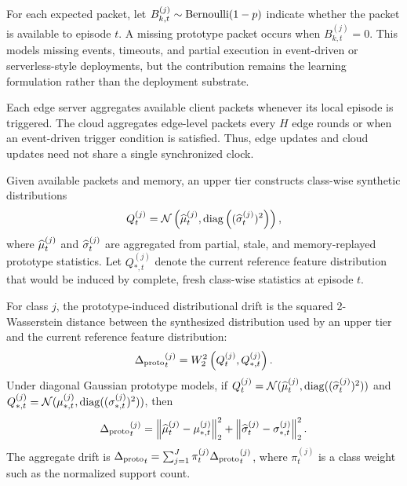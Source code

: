\begin{definition}
For each expected packet, let $B_{k,t}^{(j)}\sim\mathrm{Bernoulli}(1-p)$ indicate whether the packet is available to episode $t$. A missing prototype packet occurs when $B_{k,t}^{(j)}=0$. This models missing events, timeouts, and partial execution in event-driven or serverless-style deployments, but the contribution remains the learning formulation rather than the deployment substrate.
\end{definition}

\begin{definition}
Each edge server aggregates available client packets whenever its local episode is triggered. The cloud aggregates edge-level packets every $H$ edge rounds or when an event-driven trigger condition is satisfied. Thus, edge updates and cloud updates need not share a single synchronized clock.
\end{definition}

Given available packets and memory, an upper tier constructs class-wise synthetic distributions
\begin{equation}
    Q_{t}^{(j)}=\mathcal{N}\left(\widehat{\mu}_{t}^{(j)},
    \mathrm{diag}\left((\widehat{\sigma}_{t}^{(j)})^2\right)\right),
\end{equation}
where $\widehat{\mu}_{t}^{(j)}$ and $\widehat{\sigma}_{t}^{(j)}$ are aggregated from partial, stale, and memory-replayed prototype statistics. Let $Q_{*,t}^{(j)}$ denote the current reference feature distribution that would be induced by complete, fresh class-wise statistics at episode $t$.

\begin{definition}\label{def:proto_drift}
For class $j$, the prototype-induced distributional drift is the squared 2-Wasserstein distance between the synthesized distribution used by an upper tier and the current reference feature distribution:
\begin{equation}
    {\Delta_{\mathrm{proto}}}_t^{(j)}
    = W_2^2\left(Q_t^{(j)},Q_{*,t}^{(j)}\right).
\end{equation}
Under diagonal Gaussian prototype models, if $Q_t^{(j)}=\mathcal{N}(\widehat{\mu}_t^{(j)},\mathrm{diag}((\widehat{\sigma}_t^{(j)})^2))$ and $Q_{*,t}^{(j)}=\mathcal{N}(\mu_{*,t}^{(j)},\mathrm{diag}((\sigma_{*,t}^{(j)})^2))$, then
\begin{equation}
    {\Delta_{\mathrm{proto}}}_t^{(j)}
    = \left\|\widehat{\mu}_t^{(j)}-\mu_{*,t}^{(j)}\right\|_2^2
    + \left\|\widehat{\sigma}_t^{(j)}-\sigma_{*,t}^{(j)}\right\|_2^2.
\end{equation}
The aggregate drift is ${\Delta_{\mathrm{proto}}}_t=\sum_{j=1}^{J}\pi_t^{(j)}{\Delta_{\mathrm{proto}}}_t^{(j)}$, where $\pi_t^{(j)}$ is a class weight such as the normalized support count.
\end{definition}

